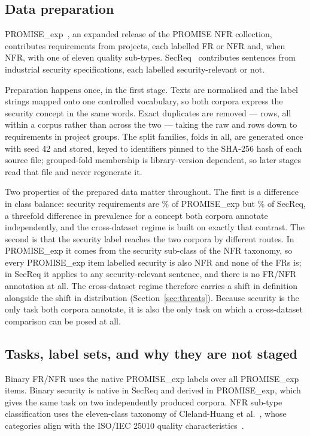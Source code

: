 \documentclass[conference]{IEEEtran}
\newcommand{\pex}{PROMISE\_exp}
\begin{document}


\subsection{Data preparation}
\label{sec:data}
\pex{}~\cite{lima2019}, an expanded release of the PROMISE NFR collection,
contributes \nNpromise{} requirements from \nNpromiseProj{} projects, each
labelled FR or NFR and, when NFR, with one of eleven quality sub-types.
SecReq~\cite{knauss2011} contributes \nNsecreq{} sentences from \nNsecreqProj{}
industrial security specifications, each labelled security-relevant or not.

Preparation happens once, in the first stage. Texts are normalised and the label
strings mapped onto one controlled vocabulary, so both corpora express the
security concept in the same words. Exact duplicates are removed --- \nNdup{}
rows, all within a corpus rather than across the two --- taking the raw
\nNpromiseRaw{} and \nNsecreqRaw{} rows down to \nNtotal{} requirements in
\nNgroups{} project groups. The \nNsplitfam{} split families, \nNfolds{} folds in
all, are generated once with seed 42 and stored, keyed to identifiers pinned to
the SHA-256 hash of each source file; grouped-fold membership is library-version
dependent, so later stages read that file and never regenerate it.

Two properties of the prepared data matter throughout. The first is a difference
in class balance: security requirements are \nPrevPromise\% of \pex{} but
\nPrevSecreq\% of SecReq, a threefold difference in prevalence for a concept both
corpora annotate independently, and the cross-dataset regime is built on exactly
that contrast. The second is that the security label reaches the two corpora by
different routes. In \pex{} it comes from the security sub-class of the NFR
taxonomy, so every \pex{} item labelled security is also NFR and none of the
\nNfrPromise{} FRs is; in SecReq it applies to any security-relevant sentence,
and there is no FR/NFR annotation at all. The cross-dataset regime therefore
carries a shift in definition alongside the shift in distribution
(Section~\ref{sec:threats}). Because security is the only task both corpora
annotate, it is also the only task on which a cross-dataset comparison can be
posed at all.

\subsection{Tasks, label sets, and why they are not staged}
Binary FR/NFR uses the native \pex{} labels over all \nNpromise{} \pex{} items.
Binary security is native in SecReq and derived in \pex{}, which gives the same
task on two independently produced corpora. NFR sub-type classification uses the
eleven-class taxonomy of Cleland-Huang et al.~\cite{clelandhuang2007}, whose
categories align with the ISO/IEC 25010 quality characteristics~\cite{iso25010}.
\end{document}
